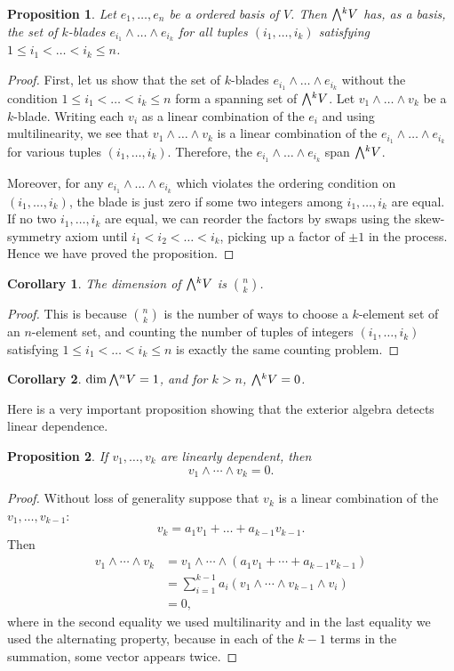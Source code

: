 \documentclass[11pt,oneside]{amsart}
\theoremstyle{definition}
\theoremstyle{plain}
\newtheorem{proposition}{Proposition}
\newtheorem{corollary}{Corollary}
\newcommand{\extp}{\mathchoice{{\textstyle\bigwedge}}%
    {{\bigwedge}}%
    {{\textstyle\wedge}}%
    {{\scriptstyle\wedge}}}
\begin{document}
\begin{proposition}
    Let $e_1,\dots,e_n$ be a ordered basis of $V$. Then $\extp^k V$ has, as a basis,  the set of $k$-blades $e_{i_1}\wedge\dots\wedge e_{i_k}$ for all tuples $(i_1,\dots,i_k)$ satisfying $1\leq i_1<\dots<i_k\leq n$.
\end{proposition}
\begin{proof}
    First, let us show that the set of $k$-blades $e_{i_1}\wedge\dots\wedge e_{i_k}$ without the condition $1\leq i_1<\dots<i_k\leq n$ form a spanning set of $\extp^k V$. Let $v_1\wedge\dots\wedge v_k$ be a $k$-blade. Writing each $v_i$ as a linear combination of the $e_i$ and using multilinearity, we see that $v_1\wedge\dots\wedge v_k$ is a linear combination of the $e_{i_1}\wedge\dots\wedge e_{i_k}$ for various tuples $(i_1,\dots,i_k)$. Therefore, the $e_{i_1}\wedge\dots\wedge e_{i_k}$ span $\extp^k V$.
    
    Moreover, for any $e_{i_1}\wedge\dots\wedge e_{i_k}$ which violates the ordering condition on $(i_1,\dots,i_k)$, the blade is just zero if some two integers among $i_1,\dots,i_k$ are equal. If no two $i_1,\dots,i_k$ are equal, we can reorder the factors by swaps using the skew-symmetry axiom until $i_1<i_2<\dots<i_k$, picking up a factor of $\pm 1$ in the process. Hence we have proved the proposition.
\end{proof}

\begin{corollary}
    The dimension of $\extp^k V$ is $\binom nk$.
\end{corollary}
\begin{proof}
    This is because $\binom nk$ is the number of ways to choose a $k$-element set of an $n$-element set, and counting the number of tuples of integers $(i_1,\dots,i_k)$ satisfying $1\leq i_1<\dots<i_k\leq n$ is exactly the same counting problem.
\end{proof}

\begin{corollary}
    $\dim\extp^n V=1$, and for $k>n$, $\extp^k V=0$.
\end{corollary}
Here is a very important proposition showing that the exterior algebra detects linear dependence.
\begin{proposition}\label{prop:dep}
    If $v_1,\dots,v_k$ are linearly dependent, then
    \[v_1\wedge\cdots\wedge v_k=0.\]
\end{proposition}
\begin{proof}
    Without loss of generality suppose that $v_k$ is a linear combination of the $v_1,\dots,v_{k-1}$:
    \[v_k=a_1v_1+\dots+a_{k-1}v_{k-1}.\]
    Then
    \[\begin{split}
        v_1\wedge\cdots\wedge v_k &= v_1\wedge\cdots\wedge (a_1v_1+\cdots+a_{k-1}v_{k-1})\\
        &= \sum_{i=1}^{k-1}a_i(v_1\wedge\cdots\wedge v_{k-1}\wedge v_i)\\
        &= 0,
    \end{split}\]
    where in the second equality we used multilinarity and in the last equality we used the alternating property, because in each of the $k-1$ terms in the summation, some vector appears twice.
\end{proof}
\end{document}
